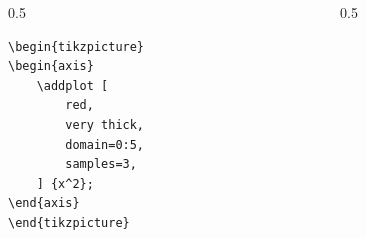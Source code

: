 \documentclass[12pt,aspectratio=169,ignorenonframetext]{ltxbeamer}
\begin{document}
\begin{frame}[fragile]
\begin{columns}
    \begin{column}{0.5\textwidth}
        \begin{verbatim}
\begin{tikzpicture}
\begin{axis}
    \addplot [
        red,
        very thick,
        domain=0:5,
        samples=3,
    ] {x^2};
\end{axis}
\end{tikzpicture}
        \end{verbatim}
    \end{column}
    {\color{gray} \vline}
    \begin{column}{0.5\textwidth}
    \end{column}
\end{columns}
\end{frame}
\end{document}
